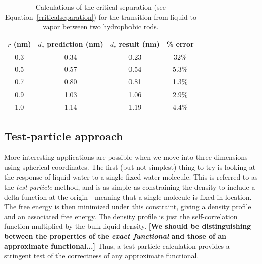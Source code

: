\documentclass[letterpaper,twocolumn,amsmath,amssymb,prb]{revtex4-1}
\newcommand{\red}[1]{{\bf \color{red} #1}}
\newcommand{\fixme}[1]{\red{[#1]}}
\begin{document}
\begin{table}
\begin{tabular} {|c|c|c|c|}
\hline
$r$ (nm) & $d_c$ prediction (nm) & $d_c$ result (nm) & \% error \\
\hline
0.3 & 0.34 & 0.23 & 32\% \\
\hline
0.5 & 0.57 & 0.54 & 5.3\% \\
\hline
0.7 & 0.80 & 0.81 & 1.3\% \\
\hline
0.9 & 1.03 & 1.06 & 2.9\% \\
\hline
1.0 & 1.14 & 1.19 & 4.4\% \\
\hline
\end{tabular}
\caption{Calculations of the critical separation (see Equation~\ref{criticalseparation})
for the transition
from liquid to vapor between two hydrophobic rods.}
\label{criticalseparationtable}
\end{table} 




\subsection{Test-particle approach}

More interesting applications are possible when we move into three
dimensions using spherical coordinates.  The first (but not simplest)
thing to try is looking at the response of liquid water to a single
fixed water molecule.  This is referred to as the \emph{test particle}
method\cite{FIXME}, and is as simple as constraining the density to
include a delta function at the origin---meaning that a single
molecule is fixed in location.  The free energy is then minimized
under this constraint, giving a density profile and an associated free
energy.  The density profile is just the self-correlation function
multiplied by the bulk liquid density.  \fixme{We should be
  distinguishing between the properties of the \emph{exact functional}
  and those of an approximate functional...}  Thus, a test-particle
calculation provides a stringent test of the correctness of any
approximate functional.
\end{document}
